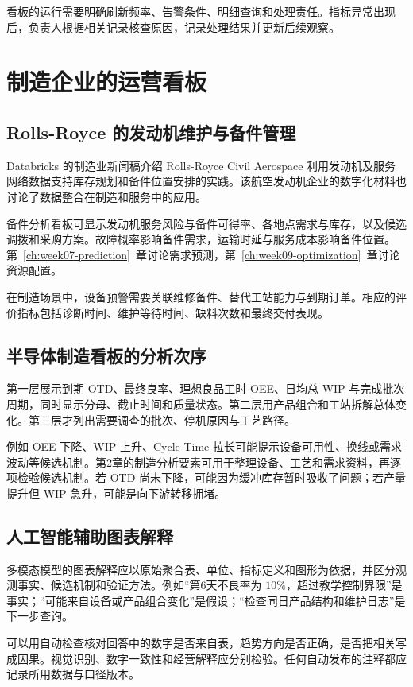 看板的运行需要明确刷新频率、告警条件、明细查询和处理责任。指标异常出现后，负责人根据相关记录核查原因，记录处理结果并更新后续观察。

\section{制造企业的运营看板}

\subsection{Rolls-Royce 的发动机维护与备件管理}
Databricks 的制造业新闻稿介绍 Rolls-Royce Civil Aerospace 利用发动机及服务网络数据支持库存规划和备件位置安排的实践\cite{rr05}。该航空发动机企业的数字化材料也讨论了数据整合在制造和服务中的应用\cite{rrdigital05}。

备件分析看板可显示发动机服务风险与备件可得率、各地点需求与库存，以及候选调拨和采购方案。故障概率影响备件需求，运输时延与服务成本影响备件位置。第~\ref{ch:week07-prediction}~章讨论需求预测，第~\ref{ch:week09-optimization}~章讨论资源配置。

在制造场景中，设备预警需要关联维修备件、替代工站能力与到期订单。相应的评价指标包括诊断时间、维护等待时间、缺料次数和最终交付表现。

\subsection{半导体制造看板的分析次序}
第一层展示到期 OTD、最终良率、理想良品工时 OEE、日均总 WIP 与完成批次周期，同时显示分母、截止时间和质量状态。第二层用产品组合和工站拆解总体变化。第三层才列出需要调查的批次、停机原因与工艺路径。

例如 OEE 下降、WIP 上升、Cycle Time 拉长可能提示设备可用性、换线或需求波动等候选机制。第2章的制造分析要素可用于整理设备、工艺和需求资料，再逐项检验候选机制。若 OTD 尚未下降，可能因为缓冲库存暂时吸收了问题；若产量提升但 WIP 急升，可能是向下游转移拥堵。

\subsection{人工智能辅助图表解释}
多模态模型的图表解释应以原始聚合表、单位、指标定义和图形为依据，并区分观测事实、候选机制和验证方法。例如“第6天不良率为 \(10\%\)，超过教学控制界限”是事实；“可能来自设备或产品组合变化”是假设；“检查同日产品结构和维护日志”是下一步查询。

可以用自动检查核对回答中的数字是否来自表，趋势方向是否正确，是否把相关写成因果。视觉识别、数字一致性和经营解释应分别检验。任何自动发布的注释都应记录所用数据与口径版本。

